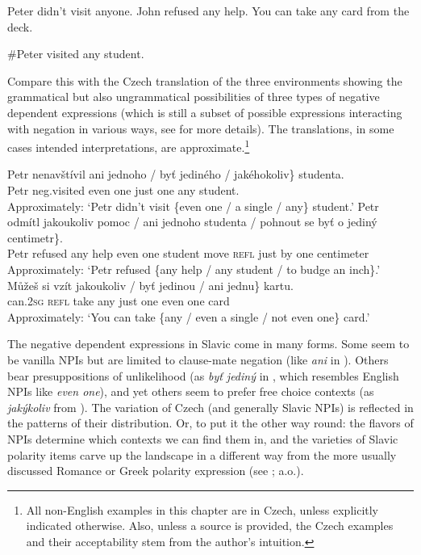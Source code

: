\documentclass[output=paper,colorlinks,citecolor=brown]{langscibook}
\begin{document}
\newpage
\ea\label{ex:1}\ea\label{ex:1-a} Peter didn't visit anyone.
\ea[]{$\neg > \exists$}
\ex[\#]{$\exists > \neg$}
\z
\ex\label{ex:1-b} John refused any help.
\z
\ex\label{ex:1-c} You can take any card from the deck.
\ea[]{$\Diamond > \exists$}
\ex[\#]{$\exists > \Diamond$}
\z
\z
\z

\ea\#\label{ex:2}Peter visited any student.
\z

\noindent Compare this with the Czech translation of the three environments showing the grammatical but also ungrammatical possibilities of three types of negative dependent expressions (which is still a subset of possible expressions interacting with negation in various ways, see  for more details). The translations, in some cases intended interpretations, are approximate.\footnote{All non-English examples in this chapter are in Czech, unless explicitly indicated otherwise. Also, unless a source is provided, the Czech examples and their acceptability stem from the author's intuition.}

\ea\label{ex:3} \ea \gll Petr nenavštívil \minsp{\{} ani jednoho / \minsp{\#} byť jediného / \minsp{\#} jakéhokoliv\} studenta.\\
Petr neg.visited {} even one {} {} just one {}  {} any student.\\
\glt Approximately: `Petr didn't visit \{even one / a single / any\} student.'
\ex \gll Petr odmítl \minsp{\{} jakoukoliv pomoc / \minsp{\#} ani jednoho studenta / pohnout se byť o jediný centimetr\}.\\
Petr refused {} any help {} {} even one student {} move \textsc{refl} just by one centimeter\\
\glt Approximately: `Petr refused \{any help / any student / to budge an inch\}.'
\ex \gll Můžeš si vzít \minsp{\{} jakoukoliv / \minsp{\#} byť jedinou / \minsp{\#} ani jednu\} kartu.\\
can.\textsc{2sg} \textsc{refl} take {} any {} {} just one {} {} even one card\\ 
\glt Approximately: `You can take \{any / even a single / not even one\} card.'
\z
\z

\noindent The negative dependent expressions in Slavic come in many forms. Some seem to be vanilla NPIs but are limited to clause-mate negation (like \emph{ani} in ). Others bear presuppositions of unlikelihood (as \emph{byť jediný} in , which resembles English NPIs like \emph{even one}), and yet others seem to prefer free choice contexts (as \emph{jakýkoliv} from ). The variation of Czech (and generally Slavic NPIs) is reflected in the patterns of their distribution. Or, to put it the other way round: the flavors of NPIs determine which contexts we can find them in, and the varieties of Slavic polarity items carve up the landscape in a different way from the more usually discussed Romance or Greek polarity expression (see \citealt{laka1990negation,giannakidou1997landscape,DalmiWitkosCeglowski2024}; a.o.).
\end{document}
